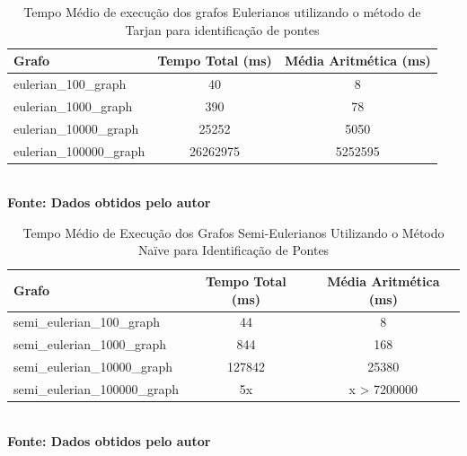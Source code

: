 \begin{table}[htb]
	\centering
	\caption{\hspace{0.1cm} Tempo Médio de execução dos grafos Eulerianos utilizando o método de Tarjan para identificação de pontes}
	\vspace{-0.3cm} %
	\label{tab:tempo_execucao_fleury}
	\begin{tabular}{l|c|c}
    \hline
    \textbf{Grafo} & \textbf{Tempo Total (ms)} & \textbf{Média Aritmética (ms)} \\
    \hline
     eulerian\_100\_graph & 40 & 8 \\
     eulerian\_1000\_graph & 390 & 78 \\
     eulerian\_10000\_graph & 25252  & 5050 \\
     eulerian\_100000\_graph & 26262975 & 5252595 \\
    \hline
 \end{tabular}
 	\vspace{.1cm}  %
	\small
	{\footnotesize\\ \textbf{Fonte: Dados obtidos pelo autor}}
\end{table}

\begin{table}[htb]
	\centering
	\caption{\hspace{0.1cm} Tempo Médio de Execução dos Grafos Semi-Eulerianos Utilizando o Método Naïve para Identificação de Pontes}
	\vspace{-0.3cm} %
	\label{tab:tempo_execucao_semi_eulerianos}
	\begin{tabular}{l|c|c}
    \hline
    \textbf{Grafo} & \textbf{Tempo Total (ms)} & \textbf{Média Aritmética (ms)} \\
    \hline
     semi\_eulerian\_100\_graph & 44 & 8 \\
     semi\_eulerian\_1000\_graph & 844 & 168 \\
     semi\_eulerian\_10000\_graph & 127842 & 25380 \\
     semi\_eulerian\_100000\_graph & 5x &  x > 7200000 \\
    \hline
 \end{tabular}
 	\vspace{.1cm}  %
	\small
	{\footnotesize\\ \textbf{Fonte: Dados obtidos pelo autor}}
\end{table}

